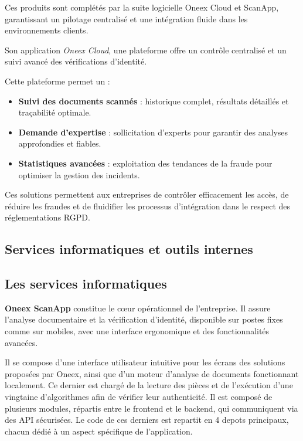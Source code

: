 Ces produits sont complétés par la suite logicielle Oneex Cloud et ScanApp, garantissant un pilotage centralisé et une intégration fluide dans les environnements clients.

Son application \emph{Oneex Cloud}, une plateforme offre un contrôle centralisé et un suivi avancé des vérifications d’identité.

Cette plateforme permet un :

\begin{itemize}
	\item \textbf{Suivi des documents scannés} : historique complet, résultats détaillés et traçabilité optimale.
	\item \textbf{Demande d’expertise} : sollicitation d’experts pour garantir des analyses approfondies et fiables.
	\item \textbf{Statistiques avancées} : exploitation des tendances de la fraude pour optimiser la gestion des incidents.
\end{itemize}

Ces solutions permettent aux entreprises de contrôler efficacement les accès, de réduire les fraudes et de fluidifier les processus d’intégration dans le respect des réglementations RGPD.

\subsection{Services informatiques et outils internes}

\subsection{Les services informatiques}

\textbf{Oneex ScanApp} constitue le cœur opérationnel de l’entreprise. Il assure l’analyse documentaire et la vérification d’identité, disponible sur postes fixes comme sur mobiles, avec une interface ergonomique et des fonctionnalités avancées.

Il se compose d’une interface utilisateur intuitive pour les écrans des solutions proposées par Oneex, ainsi que d’un moteur d’analyse de documents fonctionnant localement. Ce dernier est chargé de la lecture des pièces et de l’exécution d’une vingtaine d’algorithmes afin de vérifier leur authenticité.
Il est composé de plusieurs modules, répartis entre le frontend et le backend, qui communiquent via des API sécurisées.
Le code de ces derniers est repartit en 4 depots principaux, chacun dédié à un aspect spécifique de l'application.

